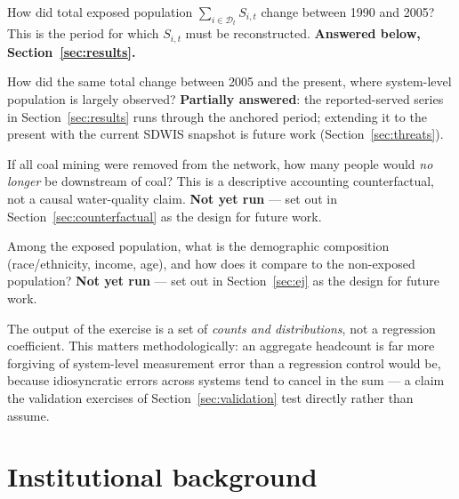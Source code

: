 \documentclass[11pt]{article}
\begin{document}
\begin{description}[leftmargin=2em,style=nextline]
  \item[Q1. Pre-period change (1990--2005).] How did total exposed population
    $\sum_{i\in\mathcal{D}_t}S_{i,t}$ change between 1990 and 2005? This is
    the period for which $S_{i,t}$ must be reconstructed. \textbf{Answered
    below, Section~\ref{sec:results}.}
  \item[Q2. Recent change (2005--present).] How did the same total change
    between 2005 and the present, where system-level population is largely
    observed? \textbf{Partially answered}: the reported-served series in
    Section~\ref{sec:results} runs through the anchored period; extending it
    to the present with the current SDWIS snapshot is future work
    (Section~\ref{sec:threats}).
  \item[Q3. No-coal counterfactual.] If all coal mining were removed from the
    network, how many people would \emph{no longer} be downstream of coal?
    This is a descriptive accounting counterfactual, not a causal
    water-quality claim. \textbf{Not yet run} --- set out in
    Section~\ref{sec:counterfactual} as the design for future work.
  \item[Q4. Environmental justice.] Among the exposed population, what is the
    demographic composition (race/ethnicity, income, age), and how does it
    compare to the non-exposed population? \textbf{Not yet run} --- set out
    in Section~\ref{sec:ej} as the design for future work.
\end{description}

The output of the exercise is a set of \emph{counts and distributions}, not a
regression coefficient. This matters methodologically: an aggregate headcount
is far more forgiving of system-level measurement error than a regression
control would be, because idiosyncratic errors across systems tend to cancel
in the sum --- a claim the validation exercises of Section~\ref{sec:validation}
test directly rather than assume.

\section{Institutional background}
\label{sec:background}
\end{document}
